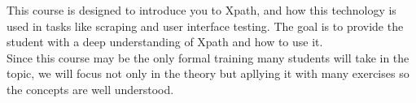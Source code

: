 This course is designed to introduce you to Xpath, and how this technology is used in tasks like scraping and user interface testing. The goal is to provide the student with a deep understanding of Xpath and how to use it.\\

Since this course may be the only formal training many students will take in the topic, we will focus not only in the theory but apllying it with many exercises so the concepts are well understood.\\




